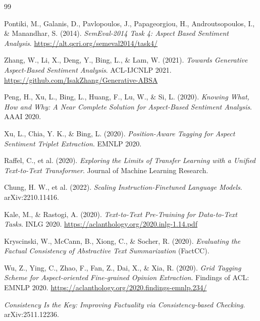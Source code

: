 \documentclass[11pt,a4paper]{article}
\begin{document}
\clearpage
{}
\begin{thebibliography}{99}

 Pontiki, M., Galanis, D., Pavlopoulos, J., Papageorgiou, H., Androutsopoulos, I., \& Manandhar, S. (2014). \emph{SemEval-2014 Task 4: Aspect Based Sentiment Analysis}. \url{https://alt.qcri.org/semeval2014/task4/}

 Zhang, W., Li, X., Deng, Y., Bing, L., \& Lam, W. (2021). \emph{Towards Generative Aspect-Based Sentiment Analysis}. ACL-IJCNLP 2021. \url{https://github.com/IsakZhang/Generative-ABSA}

 Peng, H., Xu, L., Bing, L., Huang, F., Lu, W., \& Si, L. (2020). \emph{Knowing What, How and Why: A Near Complete Solution for Aspect-Based Sentiment Analysis}. AAAI 2020.

 Xu, L., Chia, Y. K., \& Bing, L. (2020). \emph{Position-Aware Tagging for Aspect Sentiment Triplet Extraction}. EMNLP 2020.

 Raffel, C., et al. (2020). \emph{Exploring the Limits of Transfer Learning with a Unified Text-to-Text Transformer}. Journal of Machine Learning Research.

 Chung, H. W., et al. (2022). \emph{Scaling Instruction-Finetuned Language Models}. arXiv:2210.11416.

 Kale, M., \& Rastogi, A. (2020). \emph{Text-to-Text Pre-Training for Data-to-Text Tasks}. INLG 2020. \url{https://aclanthology.org/2020.inlg-1.14.pdf}

 Kryscinski, W., McCann, B., Xiong, C., \& Socher, R. (2020). \emph{Evaluating the Factual Consistency of Abstractive Text Summarization} (FactCC).

 Wu, Z., Ying, C., Zhao, F., Fan, Z., Dai, X., \& Xia, R. (2020). \emph{Grid Tagging Scheme for Aspect-oriented Fine-grained Opinion Extraction}. Findings of ACL: EMNLP 2020. \url{https://aclanthology.org/2020.findings-emnlp.234/}

 \emph{Consistency Is the Key: Improving Factuality via Consistency-based Checking}. arXiv:2511.12236.

\end{thebibliography}
\end{document}
